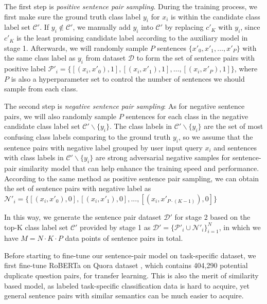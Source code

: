 \documentclass[letterpaper]{article} %
\begin{document}
  The  first step is \emph{positive sentence pair sampling}. During the training
  process,  we first make sure the ground truth class label $y_{i}$
  for  $x_{i}$  is  within  the  candidate  class  label  set $\mathcal{C'}$. If
  $y_{i}\notin  \mathcal{C'}$,  we manually add $y_{i}$ into $\mathcal{C'}$
  by  replacing  $c'_{K}$  with  $y_{i}$,  since $c'_{K}$ is the least promising
  candidate  label  according  to the auxiliary model in stage 1. Afterwards, we
  will randomly sample $P$ sentences $\{x'_{0},x'_{1}, \dots, x'_{P}\}$ with the
  same  class  label  as  $y_{i}$  from dataset $\mathcal{D}$ to form the set of
  sentence  pairs  with positive label $\mathcal{P'}_{i}=\{[(x_{i}, x'_{0}), 1],
  [(x_{i},  x'_{1}),  1],  \dots,  [(x_{i},  x'_{P}), 1]\}$, where $P$ is also a
  hyperparameter  set  to control  the number of sentences we should
  sample from each class.

  The  second  step  is  \emph{negative sentence pair sampling}: As for negative
  sentence  pairs,  we will also randomly sample $P$ sentences for each class in
  the negative candidate class label set $\mathcal{C'}\backslash \{y_{i}\}$. The
  class  labels  in  $\mathcal{C'}\backslash  \{y_{i}\}$  are  the  set  of most
  confusing  class  labels comparing to the ground truth ${y_{i}}$, so we assume
  that  the  sentence  pairs  with  negative  label  grouped by user input query
  $x_{i}$  and sentences with class labels in $\mathcal{C'}\backslash \{y_{i}\}$
  are  strong  adversarial  negative  samples for sentence-pair similarity model
  that  can  help  enhance  the training speed and performance. According to the
  same  method  as  positive  sentence  pair  sampling, we can obtain the set of
  sentence  pairs  with  negative label as $\mathcal{N'}_{i}=\{[(x_{i}, x'_{0}),
  0], [(x_{i}, x'_{1}), 0], ..., [(x_{i}, x'_{P\cdot (K-1)}), 0]\}$

  In  this  way,  we  generate the sentence pair dataset $\mathcal{D'}$ for
  stage  2 based on the top-K class label set $\mathcal{C'}$ provided by stage 1
  as   $\mathcal{D'}=\{\mathcal{P'}_{i}\cup   \mathcal{N'}_{i}\}_{i=1}^{N}$,  in
  which we have $M=N\cdot K\cdot P$ data points of sentence pairs in total.

  Before starting to fine-tune our sentence-pair model on task-specific dataset,
  we   first  fine-tune  RoBERTa  on  Quora  dataset \cite{iyer2017first},  which
  contains  404,290  potential  duplicate question pairs, for transfer learning.
  This is also the merit of similarity based model, as labeled task-specific
  classification data is hard to acquire, yet general sentence pairs with
  similar semantics can be much easier to acquire.
\end{document}
